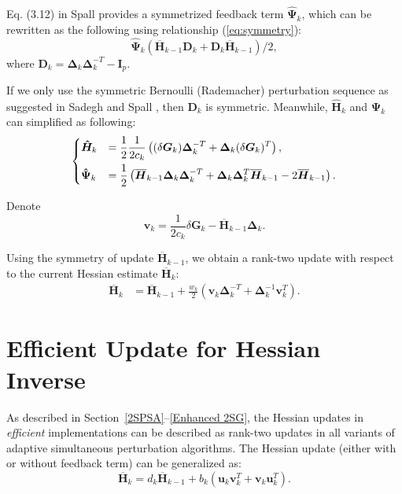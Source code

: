 \documentclass[conference,10.6cpt]{IEEEtran}
\newcommand{\bD}{\bm{D}}
\newcommand{\bG}{\bm{G}}
\newcommand{\bI}{\bm{I}}
\newcommand{\bDelta}{\bm{\Delta}}
\newcommand{\oH}{\bm{\overline{H}}}
\newcommand{\hH}{\bm{\hat{H}}}
\newcommand{\hPsi}{\bm{\hat{\Psi}}}
\begin{document}
	Eq. (3.12) in Spall \cite{Spall2009} provides a symmetrized feedback term $ \hPsi_k $, which can be rewritten as the following using relationship (\ref{eq:symmetry}):
	\begin{equation}
	\hPsi_k (\oH_{k-1}\bD_k+\bD_k\oH_{k-1})/2,
	\end{equation}
	where $ \bD_k=\bDelta_k\bDelta_k^{-T}-\bI_p$.



	If we only use the symmetric Bernoulli (Rademacher) perturbation sequence as
	suggested in Sadegh and Spall \cite{Sadegh1998}, then $\bD_k$ is
	symmetric. Meanwhile, $\hH_k$ and $\hPsi_k$ can simplified as following:
\begin{equation}
\begin{dcases}
\hH_k&=\frac{1}{2}\frac{1}{2c_k}\left( (\delta\bG_k)\bDelta_k^{-T}+\bDelta_k(\delta\bG_k)^{T} \right),\\
  \hPsi_k &=\frac{1}{2}\left( \oH_{k-1}\bDelta_k\bDelta_k^{-T}+\bDelta_k\bDelta_k^{T}\oH_{k-1}-2\oH_{k-1} \right).
\end{dcases}
\end{equation}

Denote
\begin{equation}
\bm{v}_k= \frac{1}{2c_k}\delta\bG_k-\oH_{k-1}\bDelta_k.
\end{equation}

	Using the symmetry of update $\oH_{k-1}$, we obtain a rank-two update with respect to the current Hessian estimate $\oH_k$:
	\begin{align*}
	\oH_k&=\oH_{k-1}+\frac{w_k}{2} (\bm{v}_k\bDelta_k^{-T}+\bDelta_k^{-1}\bm{v}_k^{T}).
	\end{align*}







\section{Efficient Update for Hessian Inverse}
As described in Section~\ref{2SPSA}--\ref{Enhanced 2SG}, the
Hessian updates in \textit{efficient} implementations can be described as rank-two updates in all variants of adaptive simultaneous perturbation algorithms. The Hessian update (either with or without feedback term) can be generalized as:
\begin{equation}
\label{eq:CoherentRecursion}
  \oH_{k}=d_k\oH_{k-1}+b_k(\bm{u}_k \bm{v}_k^{T}+\bm{v}_k \bm{u}_k^{T}).
\end{equation}
\end{document}
